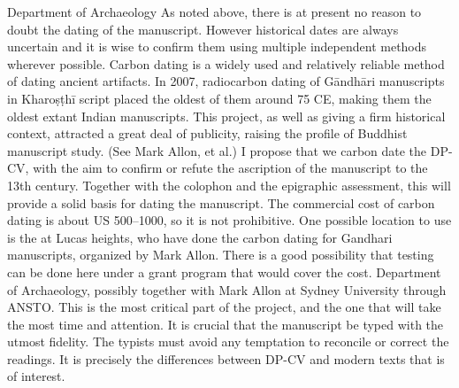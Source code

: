 {}\markdownRendererUlBeginTight
\markdownRendererUlItem {} Department of Archaeology\markdownRendererUlItemEnd 
\markdownRendererUlEndTight \markdownRendererInterblockSeparator
{}\markdownRendererInterblockSeparator
{}As noted above, there is at present no reason to doubt the dating of the manuscript. However historical dates are always uncertain and it is wise to confirm them using multiple independent methods wherever possible. Carbon dating is a widely used and relatively reliable method of dating ancient artifacts.\markdownRendererInterblockSeparator
{}In 2007, radiocarbon dating of Gāndhāri manuscripts in Kharoṣṭhī script placed the oldest of them around 75 CE, making them the oldest extant Indian manuscripts. This project, as well as giving a firm historical context, attracted a great deal of publicity, raising the profile of Buddhist manuscript study. (See Mark Allon, et al.)\markdownRendererInterblockSeparator
{}I propose that we carbon date the DP-CV, with the aim to confirm or refute the ascription of the manuscript to the 13th century. Together with the colophon and the epigraphic assessment, this will provide a solid basis for dating the manuscript.\markdownRendererInterblockSeparator
{}The commercial cost of carbon dating is about US \markdownRendererDollarSign{}500–\markdownRendererDollarSign{}1000, so it is not prohibitive. One possible location to use is the  at Lucas heights, who have done the carbon dating for Gandhari manuscripts, organized by Mark Allon. There is a good possibility that testing can be done here under a grant program that would cover the cost.\markdownRendererInterblockSeparator
{}\markdownRendererUlBeginTight
\markdownRendererUlItem {} Department of Archaeology, possibly together with Mark Allon at Sydney University through ANSTO.\markdownRendererUlItemEnd 
\markdownRendererUlEndTight \markdownRendererInterblockSeparator
{}\markdownRendererInterblockSeparator
{}This is the most critical part of the project, and the one that will take the most time and attention. It is crucial that the manuscript be typed with the utmost fidelity. The typists must avoid any temptation to reconcile or correct the readings. It is precisely the differences between DP-CV and modern texts that is of interest.\markdownRendererInterblockSeparator
